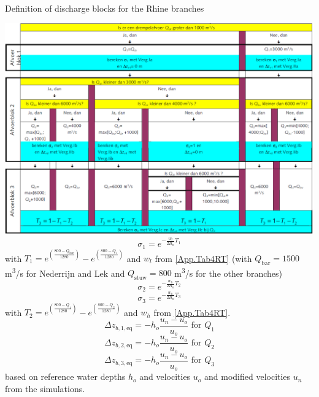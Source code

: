 \begin{table}
\caption{Definition of discharge blocks for the Rhine branches}
\label{App.Tab7}
\includegraphics[width=\columnwidth]{figures/Tab7.png}
%
\begin{equation}
\sigma_1 = e^{-\frac{w_l}{2 B_n} T_1}
\end{equation}
with $T_1 = e^{\left ( \frac{800-Q_\text{bar}}{1280} \right )} - e^{\left ( \frac{800-Q_1}{1280} \right )}$ and $w_l$ from \autoref{App.Tab4RT} (with $Q_\text{bar} = 1500$ m\textsuperscript{3}/s for Nederrijn and Lek and $Q_\text{stuw} = 800$ m\textsuperscript{3}/s for the other branches)
%
\begin{equation}
\sigma_2 = e^{-\frac{w_h}{2 B_n} T_2}
\end{equation}
%
\begin{equation}
\sigma_3 = e^{-\frac{w_h}{2 B_n} T_3}
\end{equation}
with $T_2 = e^{\left ( \frac{800-Q_1}{1280} \right )} - e^{\left ( \frac{800-Q_2}{1280} \right )}$ and $w_h$ from \autoref{App.Tab4RT}.
%
\begin{equation}
\Delta z_{b,1,\text{eq}} = -h_o \frac{u_n - u_o}{u_o} \text{  for $Q_1$}
\end{equation}
%
\begin{equation}
\Delta z_{b,2,\text{eq}} = -h_o \frac{u_n - u_o}{u_o} \text{  for $Q_2$}
\end{equation}
%
\begin{equation}
\Delta z_{b,3,\text{eq}} = -h_o \frac{u_n - u_o}{u_o} \text{  for $Q_3$}
\end{equation}
based on reference water depths $h_o$ and velocities $u_o$ and modified velocities $u_n$ from the simulations.
\end{table}



